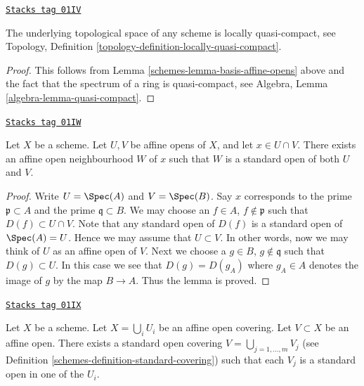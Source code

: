 \begin{lemma}
\label{schemes-lemma-locally-quasi-compact}
\href{https://stacks.math.columbia.edu/tag/01IV}{\texttt{Stacks tag 01IV}}

The underlying topological space of any scheme is
locally quasi-compact, see
Topology, Definition \ref{topology-definition-locally-quasi-compact}.
\end{lemma}

\begin{proof}

This follows from Lemma \ref{schemes-lemma-basis-affine-opens} above
and the fact that the spectrum of a ring is quasi-compact, see
Algebra, Lemma \ref{algebra-lemma-quasi-compact}.
\end{proof}

\begin{lemma}
\label{schemes-lemma-standard-open-two-affines}
\href{https://stacks.math.columbia.edu/tag/01IW}{\texttt{Stacks tag 01IW}}

Let $X$ be a scheme.
Let $U, V$ be affine opens of $X$, and let $x \in U \cap V$.
There exists an affine open neighbourhood $W$ of $x$
such that $W$ is a standard open of both $U$ and $V$.
\end{lemma}

\begin{proof}
Write $U = \Spec(A)$ and $V = \Spec(B)$.
Say $x$ corresponds to the prime $\mathfrak p \subset A$
and the prime $\mathfrak q \subset B$.
We may choose an $f \in A$, $f \not \in \mathfrak p$ such that
$D(f) \subset U \cap V$. Note that any standard open of $D(f)$
is a standard open of $\Spec(A) = U$. Hence we may assume
that $U \subset V$. In other words, now we may think of $U$
as an affine open of $V$. Next we choose a
$g \in B$, $g \not \in \mathfrak q$ such that
$D(g) \subset U$. In this case we see that $D(g) = D(g_A)$
where $g_A \in A$ denotes the image of $g$ by the map $B \to A$.
Thus the lemma is proved.
\end{proof}

\begin{lemma}
\label{schemes-lemma-good-subcover}
\href{https://stacks.math.columbia.edu/tag/01IX}{\texttt{Stacks tag 01IX}}

Let $X$ be a scheme.
Let $X = \bigcup_i U_i$ be an affine open covering.
Let $V \subset X$ be an affine open.
There exists a standard open covering
$V = \bigcup_{j = 1, \ldots, m} V_j$ (see
Definition \ref{schemes-definition-standard-covering})
such that each $V_j$ is a standard open in one of the $U_i$.
\end{lemma}

